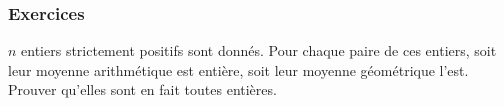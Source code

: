 
\subsubsection{Exercices}

\begin{exo}%
$n$ entiers strictement positifs sont donnés. Pour chaque paire de ces entiers, soit leur moyenne arithmétique est entière, soit leur moyenne géométrique l'est. Prouver qu'elles sont en fait toutes entières.
\end{exo}
